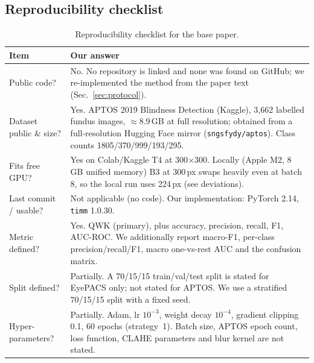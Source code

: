 \subsection{Reproducibility checklist}
\begin{table}[h]
\centering
\caption{Reproducibility checklist for the base paper.}
\label{tab:checklist}
\footnotesize
\begin{tabular}{p{}p{}}
\toprule
Item & Our answer \\
\midrule
Public code? & No. No repository is linked and none was found on GitHub; we re-implemented the method from the
paper text (Sec.~\ref{sec:protocol}). \\
Dataset public \& size? & Yes. APTOS 2019 Blindness Detection (Kaggle), 3{,}662 labelled fundus images,
$\approx$8.9\,GB at full resolution; obtained from a full-resolution Hugging Face mirror
(\texttt{sngsfydy/aptos}). Class counts 1805/370/999/193/295. \\
Fits free GPU? & Yes on Colab/Kaggle T4 at 300$\times$300. Locally (Apple M2, 8\,GB unified memory) B3 at
300\,px swaps heavily even at batch 8, so the local run uses 224\,px (see deviations). \\
Last commit / usable? & Not applicable (no code). Our implementation: PyTorch 2.14, \texttt{timm} 1.0.30. \\
Metric defined? & Yes. QWK (primary), plus accuracy, precision, recall, F1, AUC-ROC. We additionally report
macro-F1, per-class precision/recall/F1, macro one-vs-rest AUC and the confusion matrix. \\
Split defined? & Partially. A 70/15/15 train/val/test split is stated for EyePACS only; not stated for APTOS.
We use a stratified 70/15/15 split with a fixed seed. \\
Hyper-parameters? & Partially. Adam, lr $10^{-3}$, weight decay $10^{-4}$, gradient clipping 0.1, 60 epochs
(strategy~1). Batch size, APTOS epoch count, loss function, CLAHE parameters and blur kernel are not stated. \\
\bottomrule
\end{tabular}
\end{table}

